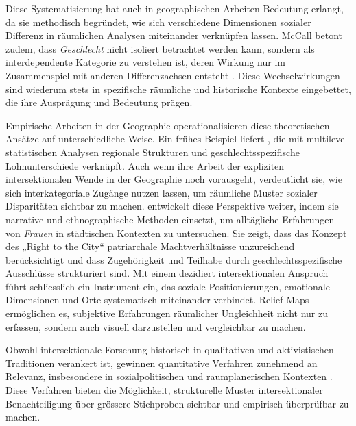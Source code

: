 Diese Systematisierung hat auch in geographischen Arbeiten Bedeutung erlangt, da sie methodisch begründet, wie sich verschiedene Dimensionen sozialer Differenz in räumlichen Analysen miteinander verknüpfen lassen. McCall betont zudem, dass \emph{Geschlecht} nicht isoliert betrachtet werden kann, sondern als interdependente Kategorie zu verstehen ist, deren Wirkung nur im Zusammenspiel mit anderen Differenzachsen entsteht \parencite{mccallSpatialRoutesGender1998}. Diese Wechselwirkungen sind wiederum stets in spezifische räumliche und historische Kontexte eingebettet, die ihre Ausprägung und Bedeutung prägen.

Empirische Arbeiten in der Geographie operationalisieren diese theoretischen Ansätze auf unterschiedliche Weise. Ein frühes Beispiel liefert \textcite{mccallSpatialRoutesGender1998}, die mit multilevel-statistischen Analysen regionale Strukturen und geschlechtsspezifische Lohnunterschiede verknüpft. Auch wenn ihre Arbeit der expliziten intersektionalen Wende in der Geographie noch vorausgeht, verdeutlicht sie, wie sich interkategoriale Zugänge nutzen lassen, um räumliche Muster sozialer Disparitäten sichtbar zu machen. \textcite{fensterRightGenderedCity2005} entwickelt diese Perspektive weiter, indem sie narrative und ethnographische Methoden einsetzt, um alltägliche Erfahrungen von \emph{Frauen} in städtischen Kontexten zu untersuchen. Sie zeigt, dass das Konzept des „Right to the City“ patriarchale Machtverhältnisse unzureichend berücksichtigt und dass Zugehörigkeit und Teilhabe durch geschlechtsspezifische Ausschlüsse strukturiert sind. Mit einem dezidiert intersektionalen Anspruch führt \textcite{rodo-de-zarateDevelopingGeographiesIntersectionality2014} schliesslich ein Instrument ein, das soziale Positionierungen, emotionale Dimensionen und Orte systematisch miteinander verbindet. Relief Maps ermöglichen es, subjektive Erfahrungen räumlicher Ungleichheit nicht nur zu erfassen, sondern auch visuell darzustellen und vergleichbar zu machen.

\vspace{2em}

Obwohl intersektionale Forschung historisch in qualitativen und aktivistischen Traditionen verankert ist, gewinnen quantitative Verfahren zunehmend an Relevanz, insbesondere in sozialpolitischen und raumplanerischen Kontexten \parencite{bauerIntersectionalityQuantitativeResearch2021}. Diese Verfahren bieten die Möglichkeit, strukturelle Muster intersektionaler Benachteiligung über grössere Stichproben sichtbar und empirisch überprüfbar zu machen.

